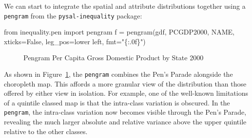 \documentclass[
  a4paper, 
  twoside,
  final
]{article}
\newenvironment{Shaded}{\begin{snugshade}}{\end{snugshade}}
\newcommand{\ImportTok}[1]{\textcolor[rgb]{0.00,0.46,0.62}{#1}}
\newcommand{\NormalTok}[1]{\textcolor[rgb]{0.00,0.23,0.31}{#1}}
\newcommand{\OperatorTok}[1]{\textcolor[rgb]{0.37,0.37,0.37}{#1}}
\newcommand{\SpecialCharTok}[1]{\textcolor[rgb]{0.37,0.37,0.37}{#1}}
\newcommand{\StringTok}[1]{\textcolor[rgb]{0.13,0.47,0.30}{#1}}
\newcommand{\VariableTok}[1]{\textcolor[rgb]{0.07,0.07,0.07}{#1}}
\begin{document}
We can start to integrate the spatial and attribute distributions
together using a \texttt{pengram} from the \texttt{pysal-inequality}
package:

\begin{Shaded}
\begin{Highlighting}[]
\ImportTok{from}\NormalTok{ inequality.pen }\ImportTok{import}\NormalTok{ pengram}
\NormalTok{f }\OperatorTok{=}\NormalTok{ pengram(gdf, }\StringTok{\textquotesingle{}PCGDP2000\textquotesingle{}}\NormalTok{, }\StringTok{\textquotesingle{}NAME\textquotesingle{}}\NormalTok{, xticks}\OperatorTok{=}\VariableTok{False}\NormalTok{, leg\_pos}\OperatorTok{=}\StringTok{\textquotesingle{}lower left\textquotesingle{}}\NormalTok{,}
\NormalTok{        fmt}\OperatorTok{=}\StringTok{"}\SpecialCharTok{\{:.0f\}}\StringTok{"}\NormalTok{)}
\end{Highlighting}
\end{Shaded}

\begin{figure}[H]


\caption{\label{fig-pengram2000}Pengram Per Capita Gross Domestic
Product by State 2000}

\end{figure}%

As shown in Figure~\ref{fig-pengram2000}, the \texttt{pengram} combines
the Pen's Parade alongside the choropleth map. This affords a more
granular view of the distribution than those offered by either view in
isolation. For example, one of the well-known limitations of a quintile
classed map is that the intra-class variation is obscured. In the
\texttt{pengram}, the intra-class variation now becomes visible through
the Pen's Parade, revealing the much larger absolute and relative
variance above the upper quintile relative to the other classes.
\end{document}

